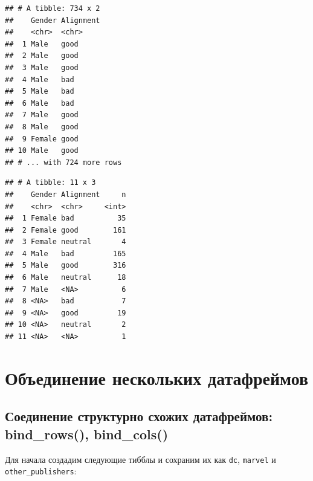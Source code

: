 \documentclass[]{book}
\newenvironment{Shaded}{\begin{snugshade}}{\end{snugshade}}
\newcommand{\KeywordTok}[1]{\textcolor[rgb]{0.13,0.29,0.53}{\textbf{#1}}}
\newcommand{\DataTypeTok}[1]{\textcolor[rgb]{0.13,0.29,0.53}{#1}}
\newcommand{\DecValTok}[1]{\textcolor[rgb]{0.00,0.00,0.81}{#1}}
\newcommand{\StringTok}[1]{\textcolor[rgb]{0.31,0.60,0.02}{#1}}
\newcommand{\OtherTok}[1]{\textcolor[rgb]{0.56,0.35,0.01}{#1}}
\newcommand{\ControlFlowTok}[1]{\textcolor[rgb]{0.13,0.29,0.53}{\textbf{#1}}}
\newcommand{\OperatorTok}[1]{\textcolor[rgb]{0.81,0.36,0.00}{\textbf{#1}}}
\newcommand{\NormalTok}[1]{#1}
\begin{document}
\begin{verbatim}
## # A tibble: 734 x 2
##    Gender Alignment
##    <chr>  <chr>    
##  1 Male   good     
##  2 Male   good     
##  3 Male   good     
##  4 Male   bad      
##  5 Male   bad      
##  6 Male   bad      
##  7 Male   good     
##  8 Male   good     
##  9 Female good     
## 10 Male   good     
## # ... with 724 more rows
\end{verbatim}

\begin{Shaded}
\end{Shaded}

\begin{verbatim}
## # A tibble: 11 x 3
##    Gender Alignment     n
##    <chr>  <chr>     <int>
##  1 Female bad          35
##  2 Female good        161
##  3 Female neutral       4
##  4 Male   bad         165
##  5 Male   good        316
##  6 Male   neutral      18
##  7 Male   <NA>          6
##  8 <NA>   bad           7
##  9 <NA>   good         19
## 10 <NA>   neutral       2
## 11 <NA>   <NA>          1
\end{verbatim}

\section{Объединение нескольких датафреймов}\label{tidy_several}

\subsection{Соединение структурно схожих датафреймов: bind\_rows(),
bind\_cols()}\label{tidy_bind}

Для начала создадим следующие тибблы и сохраним их как \texttt{dc},
\texttt{marvel} и \texttt{other\_publishers}:

\begin{Shaded}
\end{Shaded}
\end{document}
